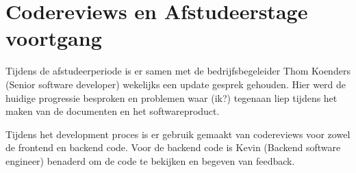 \section{Codereviews en Afstudeerstage voortgang}
Tijdens de afstudeerperiode is er samen met de bedrijfsbegeleider Thom Koenders (Senior software developer) wekelijks een update gesprek gehouden.
Hier werd de huidige progressie besproken en problemen waar (ik?) tegenaan liep tijdens het maken van de documenten en het softwareproduct.

\whitespace[2]
Tijdens het development proces is er gebruik gemaakt van codereviews voor zowel de frontend en backend code.
Voor de backend code is Kevin (Backend software engineer) benaderd om de code te bekijken en begeven van feedback.

